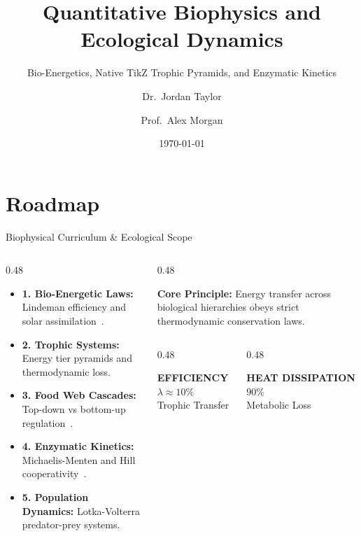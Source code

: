 \documentclass[aspectratio=169, 9pt]{beamer}
\title{Quantitative Biophysics and Ecological Dynamics}
\subtitle{Bio-Energetics, Native TikZ Trophic Pyramids, and Enzymatic Kinetics}
\author{Dr.~Jordan Taylor \and Prof.~Alex Morgan}
\institute{Institute for Quantitative Biology \& Division of Ecology}
\date{\today}
\newcommand{\kpicard}[3]{%
  \begin{tcolorbox}[enhanced, colframe=structure!20, colback=structure!3, boxrule=0.5pt, arc=2pt,
    left=3pt, right=3pt, top=2.5pt, bottom=2.5pt, halign=center]
    {\fontsize{6pt}{7pt}\selectfont\bfseries\textcolor{structure}{#1}}\\[1pt]
    {\normalsize\bfseries\textcolor{accent}{#2}}\\[1pt]
    {\tiny\textcolor{structure!70}{#3}}
  \end{tcolorbox}%
}
\begin{document}
\begin{frame}[plain]
    \titlepage
\end{frame}

\section{Roadmap}
\begin{frame}{Biophysical Curriculum \& Ecological Scope}
    \begin{columns}[c]
        \begin{column}{0.48\textwidth}
            \par\vspace{0.3em}
            \begin{itemize}\setlength{\itemsep}{2.5pt}
                \item \textbf{1. Bio-Energetic Laws:} Lindeman efficiency and solar assimilation~\cite{lindeman1942trophic}.
                \item \textbf{2. Trophic Systems:} Energy tier pyramids and thermodynamic loss.
                \item \textbf{3. Food Web Cascades:} Top-down vs bottom-up regulation~\cite{begon2006ecology}.
                \item \textbf{4. Enzymatic Kinetics:} Michaelis-Menten and Hill cooperativity~\cite{keener2009mathematical}.
                \item \textbf{5. Population Dynamics:} Lotka-Volterra predator-prey systems.
            \end{itemize}
        \end{column}
        \begin{column}{0.48\textwidth}
            \begin{takeaway}
                \textbf{\textcolor{accent}{Core Principle:}} Energy transfer across biological hierarchies obeys strict thermodynamic conservation laws.
            \end{takeaway}
            \vspace{0.4em}
            \begin{columns}[c]
                \begin{column}{0.48\textwidth}
                    \kpicard{EFFICIENCY}{$\lambda \approx 10\%$}{Trophic Transfer}
                \end{column}
                \begin{column}{0.48\textwidth}
                    \kpicard{HEAT DISSIPATION}{$90\%$}{Metabolic Loss}
                \end{column}
            \end{columns}
        \end{column}
    \end{columns}
\end{frame}
\end{document}

